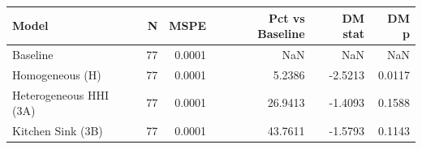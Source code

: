 \begin{tabular}{lrrrrr}
\toprule
Model & N & MSPE & Pct vs Baseline & DM stat & DM p \\
\midrule
Baseline & 77 & 0.0001 & NaN & NaN & NaN \\
Homogeneous (H) & 77 & 0.0001 & 5.2386 & -2.5213 & 0.0117 \\
Heterogeneous HHI (3A) & 77 & 0.0001 & 26.9413 & -1.4093 & 0.1588 \\
Kitchen Sink (3B) & 77 & 0.0001 & 43.7611 & -1.5793 & 0.1143 \\
\bottomrule
\end{tabular}
